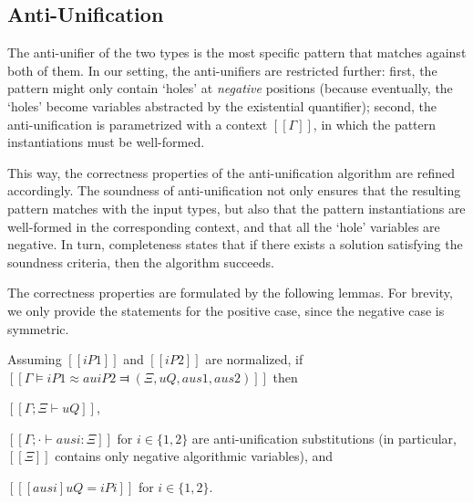         

\subsection{Anti-Unification}

The anti-unifier of the two types is the most specific pattern that matches
against both of them. In our setting, the anti-unifiers are restricted further:
first, the pattern might only contain `holes' at \emph{negative} positions
(because eventually, the `holes' become variables abstracted by the
existential quantifier); second, the anti-unification is parametrized with a
context $[[Γ]]$, in which the pattern instantiations must be well-formed.

This way, the correctness properties of the anti-unification algorithm are
refined accordingly. The soundness of anti-unification not only ensures that the
resulting pattern matches with the input types, but also that the pattern
instantiations are well-formed in the corresponding context, and that all the
`hole' variables are negative. In turn, completeness states that if there
exists a solution satisfying the soundness criteria, then the algorithm
succeeds.

The correctness properties are formulated by the following lemmas. For brevity,
we only provide the statements for the positive case, since the negative case is
symmetric. 

\begin{lemma*}
    \label{lemma:au-soundness}
     Assuming $[[iP1]]$ and $[[iP2]]$ are normalized,
    if $[[Γ ⊨ iP1 ≈au iP2 ⫤ (Ξ, uQ, aus1, aus2)]]$
    then 
    \begin{enumerate*}
        \item $[[Γ ; Ξ ⊢ uQ]]$,
        \item $[[Γ ; · ⊢ ausi : Ξ]]$ for $i \in \{1,2\}$
        are anti-unification substitutions (in particular, $[[Ξ]]$ contains only negative algorithmic variables), and
        \item $[[ [ausi] uQ = iPi ]]$ for $i \in \{1,2\}$.
    \end{enumerate*}
\end{lemma*}

